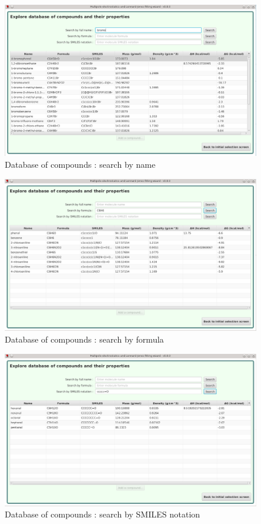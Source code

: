 \documentclass[12pt,a4paper]{article}
\begin{document}
\begin{figure}[h!]
\centering
\includegraphics[width=0.9\linewidth]{pics/scr12}
\caption{Database of compounds : search by name}
\label{fig12}
\end{figure}

\begin{figure}[h!]
\centering
\includegraphics[width=0.9\linewidth]{pics/scr13}
\caption{Database of compounds : search by formula}
\label{fig13}
\end{figure}

\begin{figure}[h!]
\centering
\includegraphics[width=0.9\linewidth]{pics/scr14}
\caption{Database of compounds : search by SMILES notation}
\label{fig14}
\end{figure}
\end{document}
